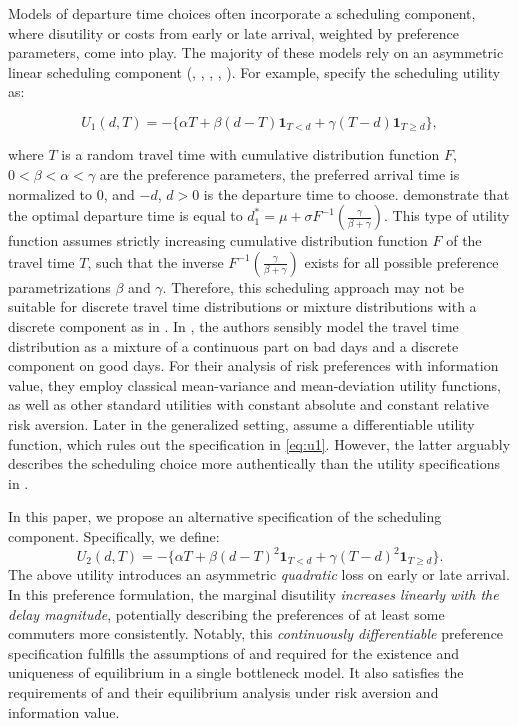 \documentclass[preprint, 3p, authoryear]{elsarticle} %
\theoremstyle{definition}
\theoremstyle{definition}
\theoremstyle{definition}
\theoremstyle{definition}
\theoremstyle{remark}
\begin{document}
Models of departure time choices often incorporate a scheduling component, where disutility or costs from early or late arrival, weighted by preference parameters, come into play. The majority of these models rely on an asymmetric linear scheduling component (\citet{fosgerau2010}, \citet{zhang2016}, \citet{guo2017}, \citet{li2019}, \citet{jin2020}). For example, \citet{fosgerau2010} specify the scheduling utility as:

\begin{equation}U_1(d,T) = -\{\alpha T + \beta(d-T)\mathbf 1_{T<d} + \gamma (T-d)\mathbf 1_{T\geq d}\}, \label{eq:u1}
\end{equation}

where \(T\) is a random travel time with cumulative distribution function \(F\), \(0<\beta<\alpha<\gamma\) are the preference parameters, the preferred arrival time is normalized to \(0\), and \(-d\), \(d>0\) is the departure time to choose.
\citet{fosgerau2010} demonstrate that the optimal departure time is equal to \(d_1^* = \mu + \sigma F^{-1}\left(\frac{\gamma}{\beta+\gamma}\right)\). This type of utility function assumes strictly increasing cumulative distribution function \(F\) of the travel time \(T\), such that the inverse \(F^{-1}\left(\frac{\gamma}{\beta+\gamma}\right)\) exists for all possible preference parametrizations \(\beta\) and \(\gamma\). Therefore, this scheduling approach may not be suitable for discrete travel time distributions or mixture distributions with a discrete component as in \citet{depalma2006}. In \citet{depalma2006}, the authors sensibly model the travel time distribution as a mixture of a continuous part on bad days and a discrete component on good days. For their analysis of risk preferences with information value, they employ classical mean-variance and mean-deviation utility functions, as well as other standard utilities with constant absolute and constant relative risk aversion. Later in the generalized setting, \citet{depalma2012} assume a differentiable utility function, which rules out the specification in \eqref{eq:u1}. However, the latter arguably describes the scheduling choice more authentically than the utility specifications in \citet{depalma2006}.

In this paper, we propose an alternative specification of the scheduling component. Specifically, we define:
\begin{equation}U_2(d,T) = -\{\alpha T + \beta(d-T)^2\mathbf 1_{T<d} + \gamma (T-d)^2\mathbf 1_{T\geq d}\}. \label{eq:u2}
\end{equation}
The above utility introduces an asymmetric \emph{quadratic} loss on early or late arrival. In this preference formulation, the marginal disutility \emph{increases linearly with the delay magnitude}, potentially describing the preferences of at least some commuters more consistently. Notably, this \emph{continuously differentiable} preference specification fulfills the assumptions of \citet{smith1984} and \citet{daganzo1985} required for the existence and uniqueness of equilibrium in a single bottleneck model. It also satisfies the requirements of \citet{depalma2012} and their equilibrium analysis under risk aversion and information value.
\end{document}
